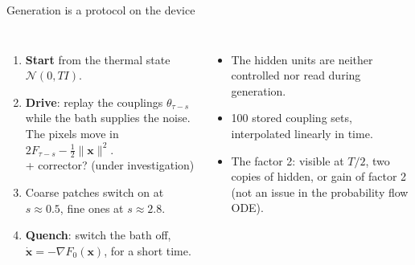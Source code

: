 \documentclass[aspectratio=169,10pt]{beamer}
\newcommand{\x}{\bm{x}}
\begin{document}
\begin{frame}{Generation is a protocol on the device}
  \begin{columns}[T,onlytextwidth]
      \begin{enumerate}\setlength{\itemsep}{7pt}
        \item \textbf{Start} from the thermal state $\mathcal N(0,TI)$.
        \item \textbf{Drive}: replay the couplings $\theta_{\tau-s}$ while the bath supplies the
          noise. The pixels move in $2F_{\tau-s}-\tfrac12\lVert\x\rVert^{2}$.\\[2pt]
          {\color{muted}+ corrector? (under investigation)}
        \item {\color{coarsecol}Coarse} patches switch on at $s\approx0.5$,
          {\color{finecol}fine} ones at $s\approx2.8$.
        \item \textbf{Quench}: switch the bath off, $\dot{\x}=-\nabla F_0(\x)$, for a short time.
      \end{enumerate}
      \vspace{0.1cm}
      \begin{itemize}\setlength{\itemsep}{7pt}
        \item The hidden units are neither controlled nor read during generation.
        \item 100 stored coupling sets, interpolated linearly in time.
        \item The factor 2: visible at $T/2$, two copies of hidden, or gain of factor 2 (not an issue in the probability flow ODE).
      \end{itemize}
  \end{columns}
\end{frame}
\end{document}
